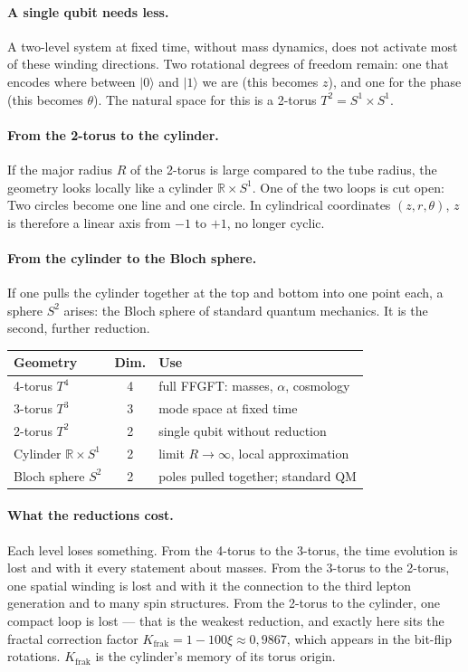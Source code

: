 \paragraph{A single qubit needs less.} A two-level system
at fixed time, without mass dynamics, does not activate most of these
winding directions. Two rotational degrees of freedom remain: one that
encodes where between $|0\rangle$ and $|1\rangle$ we are (this becomes $z$),
and one for the phase (this becomes $\theta$). The natural space for this is a 2-torus $T^2 = S^1\times S^1$.

\paragraph{From the 2-torus to the cylinder.} If the major radius $R$ of the
2-torus is large compared to the tube radius, the geometry looks locally like a
cylinder $\mathbb{R}\times S^1$. One of the two loops is
cut open: Two circles become one line and one circle. In
cylindrical coordinates $(z,r,\theta)$, $z$ is therefore a linear axis
from $-1$ to $+1$, no longer cyclic.

\paragraph{From the cylinder to the Bloch sphere.} If one pulls the cylinder together at the top
and bottom into one point each, a sphere $S^2$ arises: the
Bloch sphere of standard quantum mechanics. It is the second,
further reduction.

\begin{center}
\small\renewcommand{\arraystretch}{1.3}
\begin{tabular}{p{2.9cm}cp{3.6cm}}
\toprule
\textbf{Geometry} & \textbf{Dim.} & \textbf{Use} \\
\midrule
4-torus $T^4$ & 4 & full FFGFT: masses, $\alpha$, cosmology \\
3-torus $T^3$ & 3 & mode space at fixed time \\
2-torus $T^2$ & 2 & single qubit without reduction \\
Cylinder $\mathbb{R}\times S^1$ & 2 & limit $R\to\infty$, local approximation \\
Bloch sphere $S^2$ & 2 & poles pulled together; standard QM \\
\bottomrule
\end{tabular}
\end{center}

\paragraph{What the reductions cost.} Each level loses something. From the
4-torus to the 3-torus, the time evolution is lost and with it every
statement about masses. From the 3-torus to the 2-torus, one spatial
winding is lost and with it the connection to the third lepton generation
and to many spin structures. From the 2-torus to the cylinder, one
compact loop is lost --- that is the weakest reduction, and
exactly here sits the fractal correction factor
$K_{\mathrm{frak}} = 1-100\xi\approx0{,}9867$, which appears in the
bit-flip rotations. $K_{\mathrm{frak}}$ is the cylinder's memory of its
torus origin.

